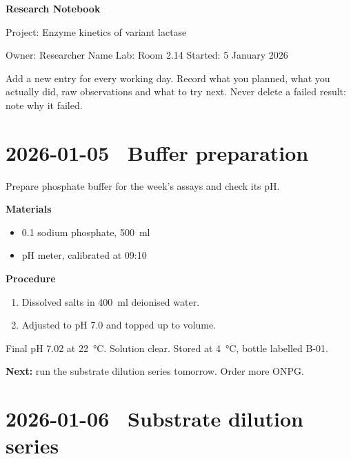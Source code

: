\documentclass[10pt,a4paper]{article}
\newcommand{\entry}[2]{\clearpage\section{#1 \textbar\ #2}}
\begin{document}
\begin{center}
{\sffamily\Huge\bfseries\color{ink} Research Notebook\par}
\vspace{0.5em}
{\large Project: Enzyme kinetics of variant lactase\par}
\vspace{0.3em}
Owner: Researcher Name \quad Lab: Room 2.14 \quad Started: 5 January 2026
\end{center}

\vspace{1em}
\begin{tcolorbox}[colback=paper,colframe=ink,title=How to use this notebook,fonttitle=\sffamily\bfseries]
Add a new entry for every working day. Record what you planned, what you actually did, raw observations and what to try next. Never delete a failed result: note why it failed.
\end{tcolorbox}

\tableofcontents

\entry{2026-01-05}{Buffer preparation}

\begin{aim}
Prepare phosphate buffer for the week's assays and check its pH.
\end{aim}

\textbf{Materials}
\begin{itemize}[nosep]
  \item \SI{0.1}{\molar} sodium phosphate, \SI{500}{\milli\litre}
  \item pH meter, calibrated at 09:10
\end{itemize}

\textbf{Procedure}
\begin{enumerate}[nosep]
  \item Dissolved salts in \SI{400}{\milli\litre} deionised water.
  \item Adjusted to pH 7.0 and topped up to volume.
\end{enumerate}

\begin{observation}
Final pH 7.02 at \SI{22}{\celsius}. Solution clear. Stored at \SI{4}{\celsius}, bottle labelled B-01.
\end{observation}

\begin{nextsteps}
\textbf{Next:} run the substrate dilution series tomorrow. Order more ONPG.
\end{nextsteps}

\entry{2026-01-06}{Substrate dilution series}
\end{document}
